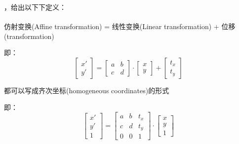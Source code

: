 \documentclass[UTF8]{ctexbook}
\begin{document}
{{{{        {，给出以下下定义：}\\\\\indent
        仿射变换(Affine transformation) = 线性变换(Linear transformation) + 位移(transformation)

        即：
        $$\left[\begin{array}{c}
              x\prime \\
              y\prime
            \end{array}\right]
          =
          \left[\begin{matrix}
              a & b \\
              c & d
            \end{matrix}\right]
          \cdot
          \left[\begin{array}{c}
              x \\
              y
            \end{array}\right]
          +
          \left[\begin{array}{c}
              t_x \\
              t_y
            \end{array}\right]$$

        都可以写成齐次坐标(homogeneous coordinates)的形式

        即：
        $$\left[\begin{array}{c}
              x\prime \\
              y\prime \\
              1
            \end{array}\right]
          =
          \left[\begin{matrix}
              a & b & t_x \\
              c & d & t_y \\
              0 & 0 & 1
            \end{matrix}\right]
          \cdot
          \left[\begin{array}{c}
              x \\
              y \\
              1
            \end{array}\right]$$

}}}}
\end{document}
